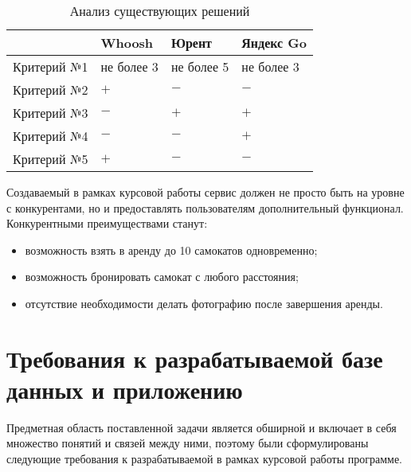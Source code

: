 \begin{table}[H]
	\caption{Анализ существующих решений}
	\label{tbl:comparison}
	{\renewcommand{\arraystretch}{1.2}
		\begin{tabularx}{\textwidth}
			{
				| >{\raggedright\arraybackslash}X
				| >{\centering\arraybackslash}X
				| >{\centering\arraybackslash}X
				| >{\centering\arraybackslash}X |
			}
			\hline
			            & \textbf{Whoosh} & \textbf{Юрент} & \textbf{Яндекс Go} \\
			\hline
			Критерий №1 & не более 3      & не более 5     & не более 3         \\
			\hline
			Критерий №2 & $+$             & $-$            & $-$                \\
			\hline
			Критерий №3 & $-$             & $+$            & $+$                \\
			\hline
			Критерий №4 & $-$             & $-$            & $+$                \\
			\hline
			Критерий №5 & $+$             & $-$            & $-$                \\
			\hline
		\end{tabularx}}
\end{table}

Создаваемый в рамках курсовой работы сервис должен не просто быть на уровне с конкурентами, но и предоставлять пользователям дополнительный функционал. Конкурентными преимуществами станут:

\begin{itemize}
	\item возможность взять в аренду до 10 самокатов одновременно;
	\item возможность бронировать самокат с любого расстояния;
	\item отсутствие необходимости делать фотографию после завершения аренды.
\end{itemize}

\section{Требования к разрабатываемой базе данных и приложению}

Предметная область поставленной задачи является обширной и включает в себя множество понятий и связей между ними, поэтому были сформулированы следующие требования к разрабатываемой в рамках курсовой работы программе.

